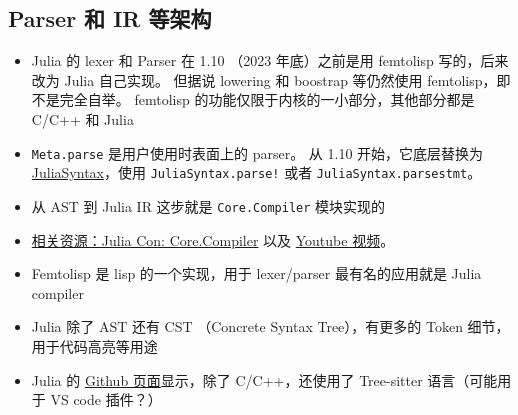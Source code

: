 \subsection{Parser 和 IR 等架构}
\begin{itemize}
\item Julia 的 lexer 和 Parser 在 1.10 （2023 年底）之前是用 femtolisp 写的，后来改为 Julia 自己实现。 但据说 lowering 和 boostrap 等仍然使用 femtolisp，即不是完全自举。 femtolisp 的功能仅限于内核的一小部分，其他部分都是 C/C++ 和 Julia
\item \verb`Meta.parse` 是用户使用时表面上的 parser。 从 1.10 开始，它底层替换为 \href{https://julialang.github.io/JuliaSyntax.jl/dev/api/}{JuliaSyntax}，使用 \verb`JuliaSyntax.parse!` 或者  \verb`JuliaSyntax.parsestmt`。
\item 从 AST 到 Julia IR 这步就是 \verb`Core.Compiler` 模块实现的
\item \href{https://pretalx.com/juliacon2024/talk/D3H79J/}{相关资源：Julia Con: Core.Compiler} 以及 \href{https://www.youtube.com/watch?v=4X59gs1dfo0}{Youtube 视频}。
\item Femtolisp 是 lisp 的一个实现，用于 lexer/parser 最有名的应用就是 Julia compiler
\item Julia 除了 AST 还有 CST （Concrete Syntax Tree），有更多的 Token 细节，用于代码高亮等用途
\item Julia 的 \href{https://github.com/JuliaLang/julia}{Github 页面}显示，除了 C/C++，还使用了 Tree-sitter 语言（可能用于 VS code 插件？）
\end{itemize}


